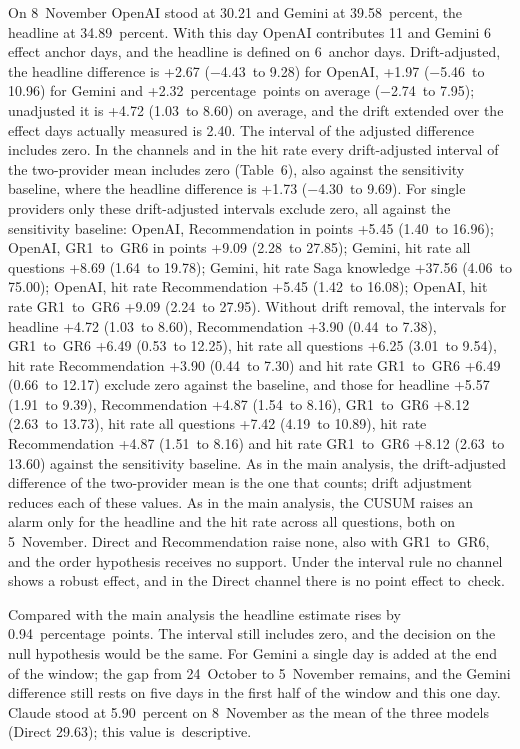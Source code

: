 \documentclass[11pt]{article}
\newcounter{none}
\begin{document}
On 8~November OpenAI stood at 30.21 and Gemini at 39.58~percent, the headline at 34.89~percent. With this day OpenAI contributes 11 and Gemini 6 effect anchor days, and the headline is defined on 6~anchor days. Drift-adjusted, the headline difference is +2.67 (−4.43~to 9.28) for OpenAI, +1.97 (−5.46~to 10.96) for Gemini and +2.32~percentage~points on average (−2.74~to 7.95); unadjusted it is +4.72 (1.03~to 8.60) on average, and the drift extended over the effect days actually measured is 2.40. The interval of the adjusted difference includes zero. In the channels and in the hit rate every drift-adjusted interval of the two-provider mean includes zero (Table~6), also against the sensitivity baseline, where the headline difference is +1.73 (−4.30~to 9.69). For single providers only these drift-adjusted intervals exclude zero, all against the sensitivity baseline: OpenAI, Recommendation in points +5.45 (1.40~to 16.96); OpenAI, GR1~to~GR6 in points +9.09 (2.28~to 27.85); Gemini, hit rate all questions +8.69 (1.64~to 19.78); Gemini, hit rate Saga knowledge +37.56 (4.06~to 75.00); OpenAI, hit rate Recommendation +5.45 (1.42~to 16.08); OpenAI, hit rate GR1~to~GR6 +9.09 (2.24~to 27.95). Without drift removal, the intervals for headline +4.72 (1.03~to 8.60), Recommendation +3.90 (0.44~to 7.38), GR1~to~GR6 +6.49 (0.53~to 12.25), hit rate all questions +6.25 (3.01~to 9.54), hit rate Recommendation +3.90 (0.44~to 7.30) and hit rate GR1~to~GR6 +6.49 (0.66~to 12.17) exclude zero against the baseline, and those for headline +5.57 (1.91~to 9.39), Recommendation +4.87 (1.54~to 8.16), GR1~to~GR6 +8.12 (2.63~to 13.73), hit rate all questions +7.42 (4.19~to 10.89), hit rate Recommendation +4.87 (1.51~to 8.16) and hit rate GR1~to~GR6 +8.12 (2.63~to 13.60) against the sensitivity baseline. As in the main analysis, the drift-adjusted difference of the two-provider mean is the one that counts; drift adjustment reduces each of these values. As in the main analysis, the CUSUM raises an alarm only for the headline and the hit rate across all questions, both on 5~November. Direct and Recommendation raise none, also with GR1~to~GR6, and the order hypothesis receives no support. Under the interval rule no channel shows a robust effect, and in the Direct channel there is no point effect to~\mbox{check.}

Compared with the main analysis the headline estimate rises by 0.94~percentage~points. The interval still includes zero, and the decision on the null hypothesis would be the same. For Gemini a single day is added at the end of the window; the gap from 24~October to 5~November remains, and the Gemini difference still rests on five days in the first half of the window and this one day. Claude stood at 5.90~percent on 8~November as the mean of the three models (Direct 29.63); this value is~\mbox{descriptive.}
\end{document}
